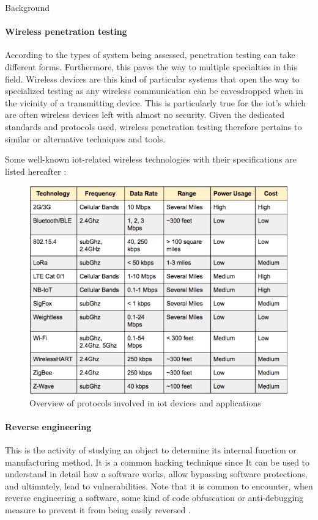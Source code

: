 \begin{chaptercover}{Background}
\paragraph{Wireless penetration testing} According to the types of system being assessed, penetration testing can take different forms. Furthermore, this paves the way to multiple specialties in this field. Wireless devices are this kind of particular systems that open the way to specialized testing as any wireless communication can be eavesdropped when in the vicinity of a transmitting device. This is particularly true for the \acrshort{iot}'s which are often wireless devices left with almost no security. Given the dedicated standards and protocols used, wireless penetration testing therefore pertains to similar or alternative techniques and tools.

Some well-known \acrshort{iot}-related wireless technologies with their specifications are listed hereafter :
\begin{figure}[H]
  \centering
  \includegraphics[width=.7\linewidth]{figures/wireless-technologies}
  \caption{Overview of protocols involved in \acrshort{iot} devices and applications \cite{iot-protocols}}
  \label{fig:wireless-technologies}
\end{figure}

\paragraph{Reverse engineering} This is the activity of studying an object to determine its internal function or manufacturing method. It is a common hacking technique since It can be used to understand in detail how a software works, allow bypassing software protections, and ultimately, lead to vulnerabilities. Note that it is common to encounter, when reverse engineering a software, some kind of code obfuscation \cite{code-obfuscation} or anti-debugging measure to prevent it from being easily reversed \cite{anti-debugging}.


\end{chaptercover}
